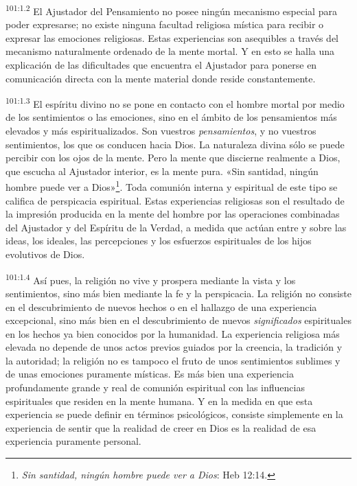 \par
\textsuperscript{101:1.2} El Ajustador del Pensamiento no posee ningún mecanismo especial para poder expresarse; no existe ninguna facultad religiosa mística para recibir o expresar las emociones religiosas. Estas experiencias son asequibles a través del mecanismo naturalmente ordenado de la mente mortal. Y en esto se halla una explicación de las dificultades que encuentra el Ajustador para ponerse en comunicación directa con la mente material donde reside constantemente.

\par
\textsuperscript{101:1.3} El espíritu divino no se pone en contacto con el hombre mortal por medio de los sentimientos o las emociones, sino en el ámbito de los pensamientos más elevados y más espiritualizados. Son vuestros \textit{pensamientos}, y no vuestros sentimientos, los que os conducen hacia Dios. La naturaleza divina sólo se puede percibir con los ojos de la mente. Pero la mente que discierne realmente a Dios, que escucha al Ajustador interior, es la mente pura. «Sin santidad, ningún hombre puede ver a Dios»\footnote{\textit{Sin santidad, ningún hombre puede ver a Dios}: Heb 12:14.}. Toda comunión interna y espiritual de este tipo se califica de perspicacia espiritual. Estas experiencias religiosas son el resultado de la impresión producida en la mente del hombre por las operaciones combinadas del Ajustador y del Espíritu de la Verdad, a medida que actúan entre y sobre las ideas, los ideales, las percepciones y los esfuerzos espirituales de los hijos evolutivos de Dios.

\par
\textsuperscript{101:1.4} Así pues, la religión no vive y prospera mediante la vista y los sentimientos, sino más bien mediante la fe y la perspicacia. La religión no consiste en el descubrimiento de nuevos hechos o en el hallazgo de una experiencia excepcional, sino más bien en el descubrimiento de nuevos \textit{significados} espirituales en los hechos ya bien conocidos por la humanidad. La experiencia religiosa más elevada no depende de unos actos previos guiados por la creencia, la tradición y la autoridad; la religión no es tampoco el fruto de unos sentimientos sublimes y de unas emociones puramente místicas. Es más bien una experiencia profundamente grande y real de comunión espiritual con las influencias espirituales que residen en la mente humana. Y en la medida en que esta experiencia se puede definir en términos psicológicos, consiste simplemente en la experiencia de sentir que la realidad de creer en Dios es la realidad de esa experiencia puramente personal.

